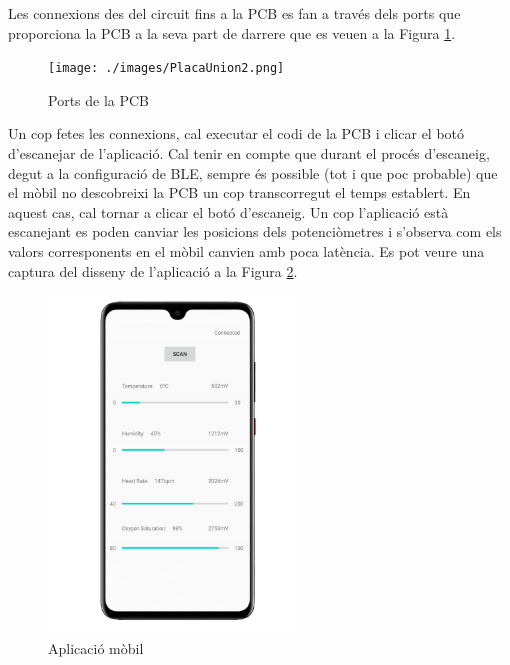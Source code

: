 Les connexions des del circuit fins a la PCB es fan a través dels ports que proporciona la PCB a la seva part de darrere que es veuen a la Figura \ref{ports_placa}.

\begin{figure}[h]
	\begin{center}
		\texttt{[image: ./images/PlacaUnion2.png]}
		\caption{Ports de la PCB}
		\label{ports_placa}
	\end{center}
\end{figure}

Un cop fetes les connexions, cal executar el codi de la PCB i clicar el botó d'escanejar de l'aplicació.
Cal tenir en compte que durant el procés d'escaneig, degut a la configuració de BLE, sempre és possible (tot i que poc probable) que el mòbil no descobreixi la PCB un cop transcorregut el temps establert.
En aquest cas, cal tornar a clicar el botó d'escaneig.
Un cop l'aplicació està escanejant es poden canviar les posicions dels potenciòmetres i s'observa com els valors corresponents en el mòbil canvien amb poca latència.
Es pot veure una captura del disseny de l'aplicació a la Figura \ref{captura_app}.

\begin{figure}[h!]
	\begin{center}
		\includegraphics[width=0.6\textwidth]{./images/captura_app_borde.png}
		\caption{Aplicació mòbil}
		\label{captura_app}
	\end{center}
\end{figure}

\newpage
